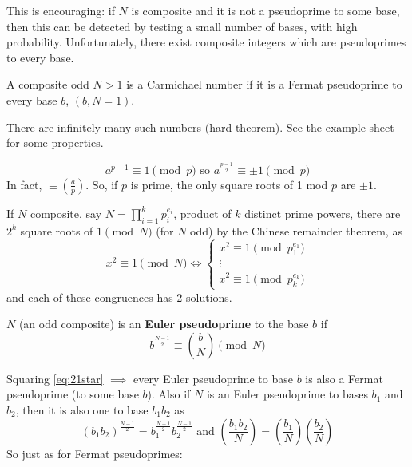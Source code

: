 \documentclass{article}
\newcommand{\legendre}[2]{\genfrac{(}{)}{}{}{#1}{#2}}
\begin{document}
This is encouraging: if $N$ is composite and it is not a pseudoprime to some base, then this can be detected by testing a small number of bases, with high probability.
Unfortunately, there exist composite integers which are pseudoprimes to every base.

\begin{defi}
    A composite odd $N>1$ is a Carmichael number if it is a Fermat pseudoprime to every base $b$, $(b,N=1)$.
\end{defi}

\begin{fact}
    There are infinitely many such numbers (hard theorem). See the example sheet for some properties.
\end{fact}

\begin{equation*}
    a^{p-1} \equiv 1 \pmod{p} \text{ so } a^{\frac{p-1}{2}} \equiv \pm 1 \pmod{p}
\end{equation*}
In fact, $\equiv \legendre{a}{p}$.
So, if $p$ is prime, the only square roots of 1 mod $p$ are $\pm 1$.

If $N$ composite, say $N = \prod_{i=1}^k p_i^{e_i}$, product of $k$ distinct prime powers, there are $2^k$ square roots of $1 \pmod{N}$ (for $N$ odd) by the Chinese remainder theorem, as
\begin{equation*}
    x^2 \equiv 1 \pmod{N} \iff
    \begin{cases}
        x^2 \equiv 1 \pmod{p_1^{e_1}} \\
        \vdots \\
        x^2 \equiv 1 \pmod{p_k^{e_k}}
    \end{cases}
\end{equation*}
and each of these congruences has 2 solutions.

\begin{defi}
    $N$ (an odd composite) is an \textbf{Euler pseudoprime} to the base $b$ if
    \begin{equation*}
        b^{\frac{N-1}{2}} \equiv \legendre{b}{N} \pmod{N} \tag{$*$} \label{eq:21star}
    \end{equation*}
\end{defi}

Squaring \eqref{eq:21star} $\implies$ every Euler pseudoprime to base $b$ is also a Fermat pseudoprime (to some base $b$).
Also if $N$ is an Euler pseudoprime to bases $b_1$ and $b_2$, then it is also one to base $b_1 b_2$ as
\begin{equation*}
    (b_1 b_2)^{\frac{N-1}{2}} = b_1^{\frac{N-1}{2}} b_2^{\frac{N-1}{2}} \text{ and } \legendre{b_1 b_2}{N} = \legendre{b_1}{N} \legendre{b_2}{N}
\end{equation*}
So just as for Fermat pseudoprimes:
\end{document}
